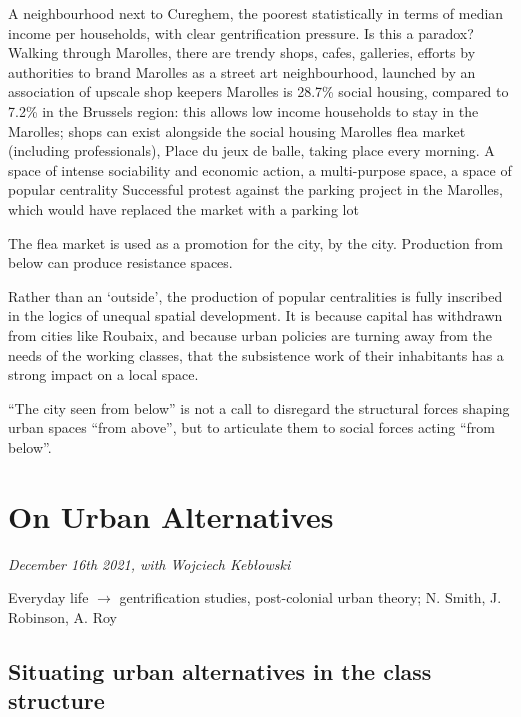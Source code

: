 \documentclass{article}
\begin{document}
\begin{outline}
	\1 A neighbourhood next to Cureghem, the poorest statistically in terms of median income per households, with clear gentrification pressure. Is this a paradox? Walking through Marolles, there are trendy shops, cafes, galleries, efforts by authorities to brand Marolles as a street art neighbourhood, launched by an association of upscale shop keepers
	\1 Marolles is 28.7\% social housing, compared to 7.2\% in the Brussels region: this allows low income households to stay in the Marolles; shops can exist alongside the social housing
	\1 Marolles flea market (including professionals), Place du jeux de balle, taking place every morning. A space of intense sociability and economic action, a multi-purpose space, a space of popular centrality
	\1 Successful protest against the parking project in the Marolles, which would have replaced the market with a parking lot
\end{outline}

The flea market is used as a promotion for the city, by the city. Production from below can produce resistance spaces.


Rather than an `outside', the production of popular centralities is fully inscribed in the logics of unequal spatial development. It is because capital has withdrawn from cities like Roubaix, and because urban policies are turning away from the needs of the working classes, that the subsistence work of their inhabitants has a strong impact on a local space.

``The city seen from below'' is not a call to disregard the structural forces shaping urban spaces ``from above'', but to articulate them to social forces acting ``from below''.


\section{On Urban Alternatives}
\textit{December 16th 2021, with Wojciech Kebłowski}

Everyday life $\rightarrow$ gentrification studies, post-colonial urban theory; N. Smith, J. Robinson, A. Roy

\subsection{Situating urban alternatives in the class structure}
\end{document}
